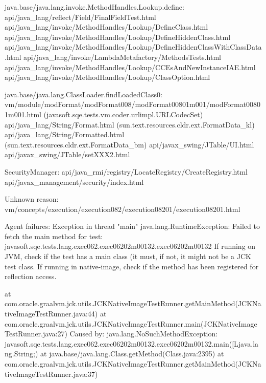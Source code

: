 java.base/java.lang.invoke.MethodHandles.Lookup.define:
api/java_lang/reflect/Field/FinalFieldTest.html
api/java_lang/invoke/MethodHandles/Lookup/DefineClass.html
api/java_lang/invoke/MethodHandles/Lookup/DefineHiddenClass.html
api/java_lang/invoke/MethodHandles/Lookup/DefineHiddenClassWithClassData.html
api/java_lang/invoke/LambdaMetafactory/MethodsTests.html
api/java_lang/invoke/MethodHandles/Lookup/CCEsAndNewInstanceIAE.html
api/java_lang/invoke/MethodHandles/Lookup/ClassOption.html

java.base/java.lang.ClassLoader.findLoadedClass0:
vm/module/modFormat/modFormat008/modFormat00801m001/modFormat00801m001.html (javasoft.sqe.tests.vm.coder.urlimpl.URLCodecSet)
api/java_lang/String/Format.html (sun.text.resources.cldr.ext.FormatData_kl)
api/java_lang/String/Formatted.html (sun.text.resources.cldr.ext.FormatData_bm)
api/javax_swing/JTable/UI.html
api/javax_swing/JTable/setXXX2.html

SecurityManager:
api/java_rmi/registry/LocateRegistry/CreateRegistry.html
api/javax_management/security/index.html

Unknown reason:
vm/concepts/execution/execution082/execution08201/execution08201.html


Agent failures:
Exception in thread "main" java.lang.RuntimeException: Failed to fetch the main method for test: javasoft.sqe.tests.lang.exec062.exec06202m00132.exec06202m00132
If running on JVM, check if the test has a main class (it must, if not, it might not be a JCK test class.
If running in native-image, check if the method has been registered for reflection access.

	at com.oracle.graalvm.jck.utils.JCKNativeImageTestRunner.getMainMethod(JCKNativeImageTestRunner.java:44)
	at com.oracle.graalvm.jck.utils.JCKNativeImageTestRunner.main(JCKNativeImageTestRunner.java:27)
Caused by: java.lang.NoSuchMethodException: javasoft.sqe.tests.lang.exec062.exec06202m00132.exec06202m00132.main([Ljava.lang.String;)
	at java.base/java.lang.Class.getMethod(Class.java:2395)
	at com.oracle.graalvm.jck.utils.JCKNativeImageTestRunner.getMainMethod(JCKNativeImageTestRunner.java:37)

